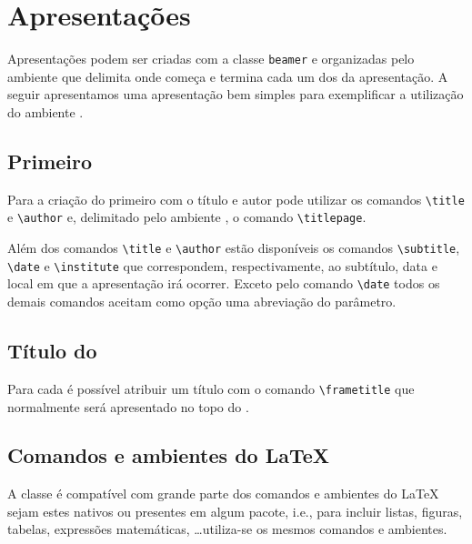 \section{Apresentações}
Apresentações podem ser criadas com a classe \lstinline{beamer} e organizadas pelo ambiente  que delimita onde começa e termina cada um dos  da apresentação. A seguir apresentamos uma apresentação bem simples para exemplificar a utilização do ambiente . \\

\subsection{Primeiro }
Para a criação do primeiro  com o título e autor pode utilizar os
comandos \lstinline!\title! e \lstinline!\author! e, delimitado pelo ambiente
, o comando \lstinline!\titlepage!.

Além dos comandos \lstinline!\title! e \lstinline!\author! estão disponíveis os
comandos \lstinline!\subtitle!, \lstinline!\date! e \lstinline!\institute! que
correspondem, respectivamente, ao subtítulo, data e local em que a apresentação
irá ocorrer. Exceto pelo comando \lstinline!\date! todos os demais comandos
aceitam como opção uma abreviação do parâmetro. \\

\subsection{Título do }
Para cada  é possível atribuir um título com o comando
\lstinline!\frametitle! que normalmente será apresentado no topo do
. \\

\subsection{Comandos e ambientes do LaTeX}
A classe  é compatível com grande parte dos comandos e ambientes
do LaTeX sejam estes nativos ou presentes em algum pacote, i.e., para incluir
listas, figuras, tabelas, expressões matemáticas, \ldots utiliza-se os mesmos
comandos e ambientes. \\
 \\

